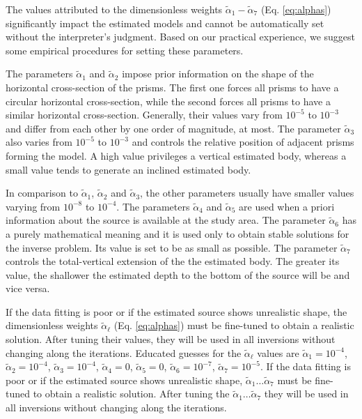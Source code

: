 
The values attributed to the dimensionless weights $\tilde{\alpha}_{1} - \tilde{\alpha}_{7}$ 
(Eq. \ref{eq:alphas}) significantly impact the estimated models and cannot be 
automatically set without the interpreter’s judgment. 
Based on our practical experience, we suggest some 
empirical procedures for setting these parameters.

The parameters $\tilde{\alpha}_1$ and $\tilde{\alpha}_2$ impose prior information 
on the shape of the horizontal cross-section of the prisms. 
The first one forces all prisms to have a circular horizontal cross-section, while 
the second forces all prisms to have a similar horizontal cross-section.
Generally, their values vary from $10^{-5}$ to $10^{-3}$ and differ from
each other by one order of magnitude, at most.
The parameter $\tilde{\alpha}_3$ also varies from $10^{-5}$ to $10^{-3}$ and 
controls the relative position of adjacent prisms forming the model.
A high value privileges a vertical estimated body, whereas a small value 
tends to generate an inclined estimated body.

In comparison to $\tilde{\alpha}_1$, $\tilde{\alpha}_2$ and $\tilde{\alpha}_3$,
the other parameters usually have smaller values varying from $10^{-8}$ to $10^{-4}$.
The parameters $\tilde{\alpha}_4$ and $\tilde{\alpha}_5$ are used when a priori
information about the source is available at the study area.
The parameter $\tilde{\alpha}_6$ has a purely mathematical meaning and it is 
used only to obtain stable solutions for the inverse problem.
Its value is set to be as small as possible.
The parameter $\tilde{\alpha}_7$ controls the total-vertical extension of the 
the estimated body. 
The greater its value, the shallower the estimated depth to the bottom of the source
will be and vice versa.

If the data fitting is poor or if the estimated source shows unrealistic shape,
the dimensionless weights $\tilde{\alpha}_{\ell}$ (Eq. \ref{eq:alphas}) must be
fine-tuned
to obtain a realistic solution. After tuning their values, they will be used in all
inversions without changing along the iterations. 
Educated guesses for the $\tilde{\alpha}_{\ell}$ values are 
$\tilde{\alpha}_1 = 10^{-4}$, $\tilde{\alpha}_2 = 10^{-4}$, $\tilde{\alpha}_3 = 10^{-4}$,
$\tilde{\alpha}_4 = 0$, $\tilde{\alpha}_5 = 0$, $\tilde{\alpha}_6 = 10^{-7}$, 
$\tilde{\alpha}_7 = 10^{-5}$.
If the data fitting is poor or if the estimated source shows  unrealistic shape, $\tilde{\alpha}_1 \dots \tilde{\alpha}_7 $ must be fine-tuned to obtain a realistic solution. 
After tuning the $\tilde{\alpha}_1 \dots \tilde{\alpha}_7 $ they will be used in all inversions without changing along the iterations.
